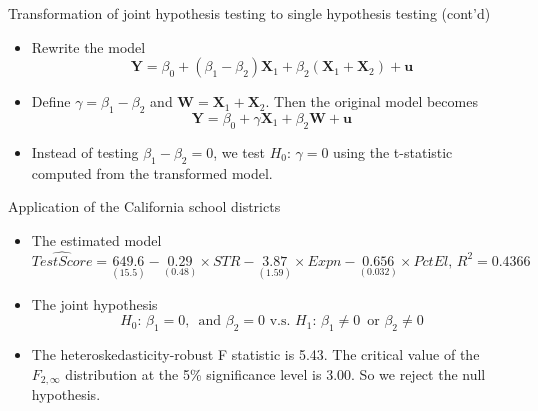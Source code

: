 \documentclass[presentation,10pt]{beamer}
\begin{document}
\begin{frame}[label={sec:orgd887d12}]{Transformation of joint hypothesis testing to single hypothesis testing (cont'd)}
\begin{itemize}
\item Rewrite the model
\begin{equation*}
\mathbf{Y} = \beta_0 + (\beta_1 - \beta_2) \mathbf{X}_1 + \beta_2 (\mathbf{X}_1 + \mathbf{X}_2) + \mathbf{u}
\end{equation*}

\item Define \(\gamma = \beta_1 - \beta_2\) and \(\mathbf{W} =
  \mathbf{X}_1 + \mathbf{X}_2\). Then the original model becomes
\[ \mathbf{Y} = \beta_0 + \gamma \mathbf{X}_1 + \beta_2
  \mathbf{W} + \mathbf{u} \]

\item Instead of testing \(\beta_1 - \beta_2 = 0\), we test \(H_0:\, \gamma
  = 0\) using the t-statistic computed from the transformed model.
\end{itemize}
\end{frame}

\begin{frame}[label={sec:orgc55924b}]{Application of the California school districts}
\begin{itemize}
\item The estimated model
\begin{equation*}
\widehat{TestScore} = \underset{{\displaystyle (15.5)}}{649.6}
- \underset{\displaystyle (0.48)}{0.29} \times STR
- \underset{\displaystyle (1.59)}{3.87} \times Expn
- \underset{\displaystyle (0.032)}{0.656} \times PctEl,\, R^2 = 0.4366
\end{equation*}

\item The joint hypothesis
\[H_0:\, \beta_1 = 0,\,\text{ and } \beta_2 = 0 \text{ v.s. }
    H_1:\, \beta_1 \neq 0\,\text{ or } \beta_2 \neq 0\]

\item The heteroskedasticity-robust F statistic is 5.43. The critical
value of the \(F_{2,\infty}\) distribution at the 5\% significance
level is 3.00. So we reject the null hypothesis.
\end{itemize}
\end{frame}
\end{document}
